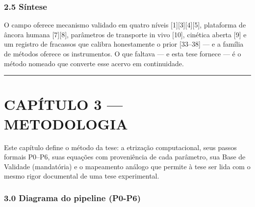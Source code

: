 \documentclass[
  10pt,
]{article}
\begin{document}
\hypertarget{suxedntese}{%
\subsubsection{2.5 Síntese}\label{suxedntese}}

O campo oferece mecanismo validado em quatro níveis
{[}1{]}{[}3{]}{[}4{]}{[}5{]}, plataforma de âncora humana
{[}7{]}{[}8{]}, parâmetros de transporte in vivo {[}10{]}, cinética
aberta {[}9{]} e um registro de fracassos que calibra honestamente o
prior {[}33--38{]} --- e a família de métodos oferece os instrumentos. O
que faltava --- e esta tese fornece --- é o método nomeado que converte
esse acervo em continuidade.

\begin{center}\rule{0.5\linewidth}{0.5pt}\end{center}

\hypertarget{capuxedtulo-3-metodologia}{%
\section{CAPÍTULO 3 --- METODOLOGIA}\label{capuxedtulo-3-metodologia}}

Este capítulo define o método da tese: a etrização computacional, seus
passos formais P0--P6, suas equações com proveniência de cada parâmetro,
sua Base de Validade (mandatória) e o mapeamento análogo que permite à
tese ser lida com o mesmo rigor documental de uma tese experimental.

\hypertarget{diagrama-do-pipeline-p0-p6}{%
\subsubsection{3.0 Diagrama do pipeline
(P0-P6)}\label{diagrama-do-pipeline-p0-p6}}
\end{document}
